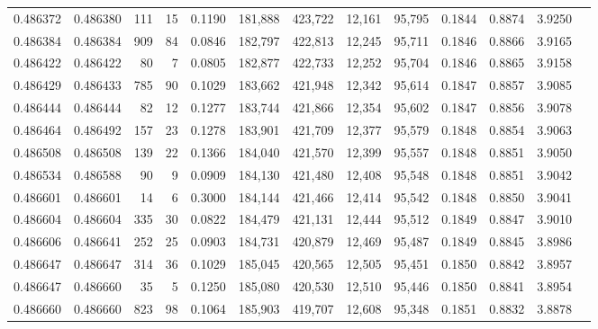 \begin{tabular}{rrrrrrrrrrrrr}
0.486372 & 0.486380 &   111 &    15 &                                     0.1190 & 181,888 & 423,722 &  12,161 &  95,795 & 0.1844 & 0.8874 & 3.9250 \\
0.486384 & 0.486384 &   909 &    84 &                                     0.0846 & 182,797 & 422,813 &  12,245 &  95,711 & 0.1846 & 0.8866 & 3.9165 \\
0.486422 & 0.486422 &    80 &     7 &                                     0.0805 & 182,877 & 422,733 &  12,252 &  95,704 & 0.1846 & 0.8865 & 3.9158 \\
0.486429 & 0.486433 &   785 &    90 &                                     0.1029 & 183,662 & 421,948 &  12,342 &  95,614 & 0.1847 & 0.8857 & 3.9085 \\
0.486444 & 0.486444 &    82 &    12 &                                     0.1277 & 183,744 & 421,866 &  12,354 &  95,602 & 0.1847 & 0.8856 & 3.9078 \\
0.486464 & 0.486492 &   157 &    23 &                                     0.1278 & 183,901 & 421,709 &  12,377 &  95,579 & 0.1848 & 0.8854 & 3.9063 \\
0.486508 & 0.486508 &   139 &    22 &                                     0.1366 & 184,040 & 421,570 &  12,399 &  95,557 & 0.1848 & 0.8851 & 3.9050 \\
0.486534 & 0.486588 &    90 &     9 &                                     0.0909 & 184,130 & 421,480 &  12,408 &  95,548 & 0.1848 & 0.8851 & 3.9042 \\
0.486601 & 0.486601 &    14 &     6 &                                     0.3000 & 184,144 & 421,466 &  12,414 &  95,542 & 0.1848 & 0.8850 & 3.9041 \\
0.486604 & 0.486604 &   335 &    30 &                                     0.0822 & 184,479 & 421,131 &  12,444 &  95,512 & 0.1849 & 0.8847 & 3.9010 \\
0.486606 & 0.486641 &   252 &    25 &                                     0.0903 & 184,731 & 420,879 &  12,469 &  95,487 & 0.1849 & 0.8845 & 3.8986 \\
0.486647 & 0.486647 &   314 &    36 &                                     0.1029 & 185,045 & 420,565 &  12,505 &  95,451 & 0.1850 & 0.8842 & 3.8957 \\
0.486647 & 0.486660 &    35 &     5 &                                     0.1250 & 185,080 & 420,530 &  12,510 &  95,446 & 0.1850 & 0.8841 & 3.8954 \\
0.486660 & 0.486660 &   823 &    98 &                                     0.1064 & 185,903 & 419,707 &  12,608 &  95,348 & 0.1851 & 0.8832 & 3.8878 \\

\end{tabular}
